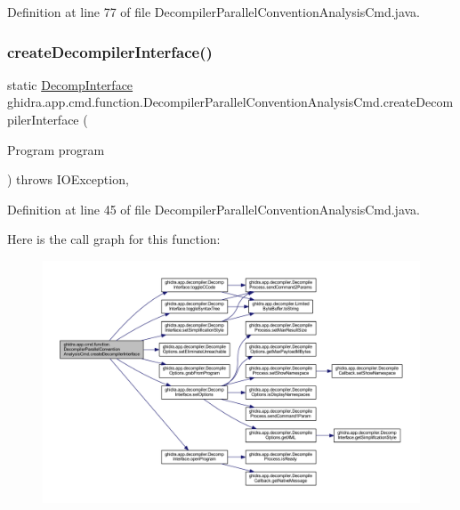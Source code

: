 Definition at line 77 of file Decompiler\+Parallel\+Convention\+Analysis\+Cmd.\+java.

\mbox{\label{classghidra_1_1app_1_1cmd_1_1function_1_1_decompiler_parallel_convention_analysis_cmd_a6041f758e847f56c0fb2d7b7f7307a16}} 
\subsubsection{\texorpdfstring{createDecompilerInterface()}{createDecompilerInterface()}}
{\footnotesize\ttfamily static \mbox{\hyperlink{classghidra_1_1app_1_1decompiler_1_1_decomp_interface}{Decomp\+Interface}} ghidra.\+app.\+cmd.\+function.\+Decompiler\+Parallel\+Convention\+Analysis\+Cmd.\+create\+Decompiler\+Interface (\begin{DoxyParamCaption}\item[{Program}]{program }\end{DoxyParamCaption}) throws I\+O\+Exception\hspace{0.3cm}{\ttfamily [inline]}, {\ttfamily [static]}}



Definition at line 45 of file Decompiler\+Parallel\+Convention\+Analysis\+Cmd.\+java.

Here is the call graph for this function\+:
\nopagebreak
\begin{figure}[H]
\begin{center}
\leavevmode
\includegraphics[width=350pt]{classghidra_1_1app_1_1cmd_1_1function_1_1_decompiler_parallel_convention_analysis_cmd_a6041f758e847f56c0fb2d7b7f7307a16_cgraph}
\end{center}
\end{figure}


